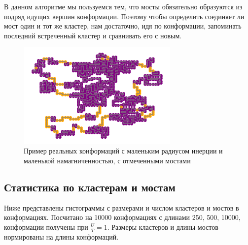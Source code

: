 В данном алгоритме мы пользуемся тем, что мосты обязательно образуются из подряд идущих вершин конформации. Поэтому чтобы определить соединяет ли мост один и тот же кластер, нам достаточно, идя по конформации, запоминать последний встреченный кластер и сравнивать его с новым.

\begin{figure}[h]
	\centering
	\includegraphics[width=0.70\textwidth]{../images/bridges_example_1.png}  
	\caption{Пример реальных конформаций с маленьким радиусом инерции и маленькой намагниченностью, с отмеченными мостами}
	\label{fig:clusters_and_bridges}
\end{figure}

\subsection{Статистика по кластерам и мостам}
Ниже представлены гистограммы с размерами и числом кластеров и мостов в конформациях. Посчитано на 10000 конформациях с длинами 250, 500, 10000, конформации получены при $\frac{U}{T} = 1$. Размеры кластеров и длины мостов нормированы на длины конформаций. 


